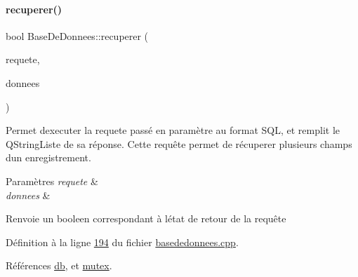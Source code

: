 \mbox{\label{class_base_de_donnees_a2a5c461fa11d404810ae3ebe035d5190}} 
\paragraph{\texorpdfstring{recuperer()}{recuperer()}\hspace{0.1cm}{\footnotesize\ttfamily [2/4]}}
{\footnotesize\ttfamily bool Base\+De\+Donnees\+::recuperer (\begin{DoxyParamCaption}\item[{Q\+String}]{requete,  }\item[{Q\+String\+List \&}]{donnees }\end{DoxyParamCaption})}



Permet d\textquotesingle{}executer la requete passé en paramètre au format S\+QL, et remplit le Q\+String\+Liste de sa réponse. Cette requête permet de récuperer plusieurs champs d\textquotesingle{}un enregistrement. 


\begin{DoxyParams}{Paramètres}
{\em requete} & \\
\hline
{\em donnees} & \\
\hline
\end{DoxyParams}
\begin{DoxyReturn}{Renvoie}
un booleen correspondant à l\textquotesingle{}état de retour de la requête 
\end{DoxyReturn}


Définition à la ligne \hyperlink{basededonnees_8cpp_source_l00194}{194} du fichier \hyperlink{basededonnees_8cpp_source}{basededonnees.\+cpp}.



Références \hyperlink{basededonnees_8h_source_l00030}{db}, et \hyperlink{basededonnees_8h_source_l00031}{mutex}.


